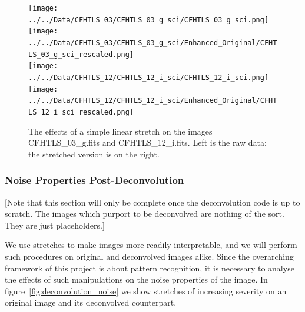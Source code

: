 \documentclass[letterpaper, 11pt]{article}
\begin{document}
\begin{figure}[h]
	\centering
	\texttt{[image: ../../Data/CFHTLS\_03/CFHTLS\_03\_g\_sci/CFHTLS\_03\_g\_sci.png]}	
	\texttt{[image: ../../Data/CFHTLS\_03/CFHTLS\_03\_g\_sci/Enhanced\_Original/CFHTLS\_03\_g\_sci\_rescaled.png]}\\\vspace{1mm}	
	\texttt{[image: ../../Data/CFHTLS\_12/CFHTLS\_12\_i\_sci/CFHTLS\_12\_i\_sci.png]}	
	\texttt{[image: ../../Data/CFHTLS\_12/CFHTLS\_12\_i\_sci/Enhanced\_Original/CFHTLS\_12\_i\_sci\_rescaled.png]}
	\caption{The effects of a simple linear stretch on the images CFHTLS\_03\_g.fits and CFHTLS\_12\_i.fits. Left is the raw data; the stretched version is on the right.}
	\label{fig:linear_stretch}
\end{figure}


\subsubsection{Noise Properties Post-Deconvolution}
\label{sec:deconvolution_noise}

[Note that this section will only be complete once the deconvolution code is up to scratch. The images which purport to be deconvolved are nothing of the sort. They are just placeholders.]

We use stretches to make images more readily interpretable, and we will perform such procedures on original and deconvolved images alike. Since the overarching framework of this project is about pattern recognition, it is necessary to analyse the effects of such manipulations on the noise properties of the image. In figure~\vref{fig:deconvolution_noise} we show stretches of increasing severity on an original image and its deconvolved counterpart.
\end{document}
